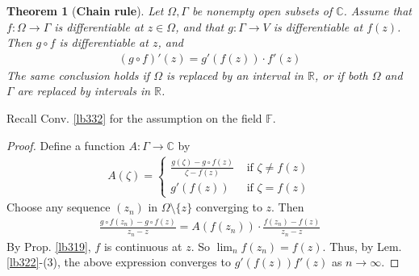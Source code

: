 \documentclass[12pt,b5paper,notitlepage]{article}
\theoremstyle{definition}
\theoremstyle{plain}
\newtheorem{thm}[df]{Theorem}
\newcommand{\Cbb}{\mathbb C}
\newcommand{\Rbb}{\mathbb R}
\newcommand{\Fbb}{\mathbb F}
\newcommand{\dps}{\displaystyle}
\numberwithin{equation}{section}
\begin{document}
\begin{thm}[\textbf{Chain rule}] \label{lb331}
Let $\Omega,\Gamma$ be nonempty open subsets of $\Cbb$. Assume that $f:\Omega\rightarrow\Gamma$ is differentiable at $z\in\Omega$, and that $g:\Gamma\rightarrow V$ is differentiable at $f(z)$. Then $g\circ f$ is differentiable at $z$, and
\begin{align}
(g\circ f)'(z)=g'(f(z))\cdot f'(z)\label{eq125}
\end{align}
The same conclusion holds if $\Omega$ is replaced by an interval in $\Rbb$, or if both $\Omega$ and $\Gamma$ are replaced by intervals in $\Rbb$.
\end{thm}

Recall Conv. \ref{lb332} for the assumption on the field $\Fbb$.


\begin{comment}
The most natural idea is to  compute the limit of
\begin{align*}
\frac{g\circ f(w)-g\circ f(z)}{w-z}=\frac{f(w)-f(z)}{w-z}\cdot\frac{g\circ f(w)-g\circ f(z)}{f(w)-f(z)}
\end{align*}
as $w\rightarrow z$ (understood as limits of nets as indicated in Rem. \ref{lb318}). However, the RHS of this expression does not make sense when $f(w)=f(z)$, and this bad situation may happen for many $w\in\Omega\setminus\{z\}$. We overcome this difficulty by changing the language of the proof slightly, without changing the key idea too much.
\end{comment}



\begin{proof}
Define a function $A:\Gamma\rightarrow\Cbb$ by
\begin{gather*}
A(\zeta)=\left\{
\begin{array}{ll}
\dps\frac{g(\zeta)-g\circ f(z)}{\zeta-f(z)}&\text{ if }\zeta\neq f(z)\\[2ex]
\dps g'(f(z))&\text{ if }\zeta=f(z)
\end{array}
\right.
\end{gather*}
Choose any sequence $(z_n)$ in $\Omega\setminus\{z\}$ converging to $z$. Then
\begin{align*}
\frac{g\circ f(z_n)-g\circ f(z)}{z_n-z}=A(f(z_n))\cdot\frac{f(z_n)-f(z)}{z_n-z}
\end{align*}
By Prop. \ref{lb319}, $f$ is continuous at $z$. So $\lim_n f(z_n)=f(z)$. Thus, by Lem. \ref{lb322}-(3), the above expression converges to $g'(f(z))f'(z)$ as $n\rightarrow\infty$.
\end{proof}
\end{document}
